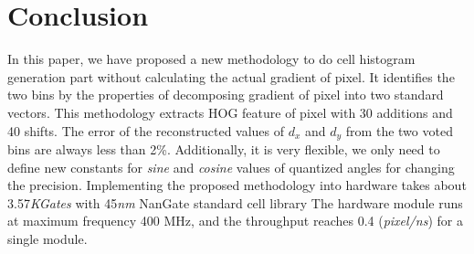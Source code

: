 %
%

\section{Conclusion}
\label{sec:conclusion}

In this paper, we have proposed a new methodology to do cell histogram generation
part without calculating the actual gradient of pixel.
It identifies the two bins by the properties of decomposing gradient of pixel
into two standard vectors.
This methodology  extracts HOG feature of pixel with 30
additions and 40 shifts.
The error of the reconstructed values of $d_x$ and $d_y$ from the two voted bins are always
less than 2\%.
Additionally, it is very flexible, we only need to define new constants
for  \textit{sine}  and \textit{cosine} values of quantized angles for changing the precision.
Implementing the proposed methodology into hardware takes about 3.57\textit{KGates}
with 45\textit{nm} NanGate standard cell library
The hardware module runs at maximum frequency 400 MHz, and the throughput reaches
0.4 (\textit{pixel/ns}) for a single module.

